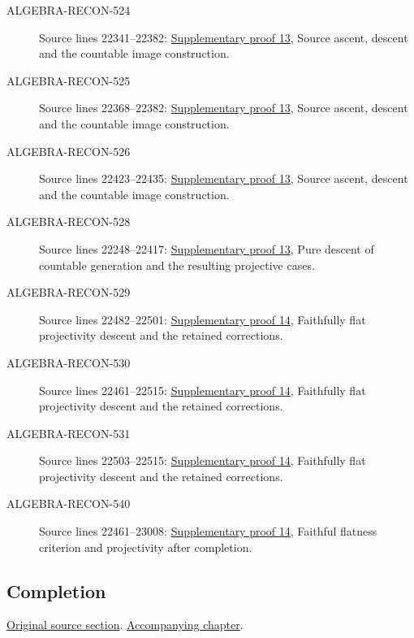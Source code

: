 \begin{description}
\item[ALGEBRA-RECON-524] Source lines 22341--22382: \hyperlink{algebra_ml_coherent_notes_20260927}{Supplementary proof 13}, Source ascent, descent and the countable image construction.
\item[ALGEBRA-RECON-525] Source lines 22368--22382: \hyperlink{algebra_ml_coherent_notes_20260927}{Supplementary proof 13}, Source ascent, descent and the countable image construction.
\item[ALGEBRA-RECON-526] Source lines 22423--22435: \hyperlink{algebra_ml_coherent_notes_20260927}{Supplementary proof 13}, Source ascent, descent and the countable image construction.
\item[ALGEBRA-RECON-528] Source lines 22248--22417: \hyperlink{algebra_ml_coherent_notes_20260927}{Supplementary proof 13}, Pure descent of countable generation and the resulting projective cases.
\item[ALGEBRA-RECON-529] Source lines 22482--22501: \hyperlink{algebra_projectivity_completion_notes_20260927}{Supplementary proof 14}, Faithfully flat projectivity descent and the retained corrections.
\item[ALGEBRA-RECON-530] Source lines 22461--22515: \hyperlink{algebra_projectivity_completion_notes_20260927}{Supplementary proof 14}, Faithfully flat projectivity descent and the retained corrections.
\item[ALGEBRA-RECON-531] Source lines 22503--22515: \hyperlink{algebra_projectivity_completion_notes_20260927}{Supplementary proof 14}, Faithfully flat projectivity descent and the retained corrections.
\item[ALGEBRA-RECON-540] Source lines 22461--23008: \hyperlink{algebra_projectivity_completion_notes_20260927}{Supplementary proof 14}, Faithful flatness criterion and projectivity after completion.
\end{description}

\subsection{Completion}
\hypertarget{algebra-source-section-completion}{}
\noindent\href{https://github.com/stacks/stacks-project/blob/a04446e57ec1fbc252a871afcec7752fb2807b14/algebra.tex\#L22528}{Original source section}. \href{algebra.pdf\#nameddest=section-completion}{Accompanying chapter}.

